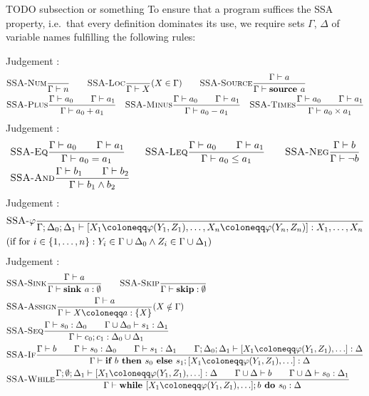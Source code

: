 TODO subsection or something
To ensure that a program suffices the SSA property, i.e.\ that every definition dominates its use,
we require sets $\Gamma$, $\Delta$ of variable names fulfilling the following rules:

Judgement :
\begin{align*}
    &\textsc{SSA-Num}\frac{\displaystyle }{\displaystyle \Gamma \vdash {n}}\qquad
    \textsc{SSA-Loc}\frac{\displaystyle }{\displaystyle \Gamma \vdash {X}}\text{($X \in \Gamma$)}\qquad
    \textsc{SSA-Source}\frac{\displaystyle \Gamma \vdash {a}}{\displaystyle \Gamma \vdash {\textbf{source }{a}}}\\
    &\textsc{SSA-Plus}\frac{\displaystyle \Gamma \vdash {a_0}\qquad\Gamma \vdash {a_1}}{\displaystyle \Gamma \vdash {a_0+a_1}}\quad
    \textsc{SSA-Minus}\frac{\displaystyle \Gamma \vdash {a_0}\qquad\Gamma \vdash {a_1}}{\displaystyle \Gamma \vdash {a_0-a_1}}\quad
    \textsc{SSA-Times}\frac{\displaystyle \Gamma \vdash {a_0}\qquad\Gamma \vdash {a_1}}{\displaystyle \Gamma \vdash {a_0 \times a_1}}
\end{align*}
Judgement :
\begin{align*}
    &\textsc{SSA-Eq}\frac{\displaystyle \Gamma \vdash {a_0}\qquad \Gamma \vdash {a_1}}{\displaystyle \Gamma \vdash {a_0 = a_1}}\qquad
    \textsc{SSA-Leq}\frac{\displaystyle \Gamma \vdash {a_0}\qquad \Gamma \vdash {a_1}}{\displaystyle \Gamma \vdash {a_0 \leq a_1}}\qquad
    \textsc{SSA-Neg}\frac{\displaystyle \Gamma \vdash {b}}{\displaystyle \Gamma \vdash {\neg b}}\\
    &\textsc{SSA-And}\frac{\displaystyle \Gamma \vdash {b_1}\qquad\Gamma \vdash {b_2}}{\displaystyle \Gamma \vdash {b_1 \land b_2}}\\
\end{align*}
Judgement :
\begin{align*}
    &\rule{SSA-$\varphi$}{}{\typestep{\Gamma;\Delta_0;\Delta_1}{\defaultphilistn}{X_1, \ldots, X_n}}\\
    &\text{(if for $i \in \{1, \ldots, n\}: Y_i \in \Gamma \cup \Delta_0 \land Z_i \in \Gamma \cup \Delta_1$)}
\end{align*}
Judgement :
\begin{align*}
    &\rule{SSA-Sink}{\typestmt{\Gamma}{a}}{\typestep{\Gamma}{\sink{a}}{\emptyset}}\qquad
    \rule{SSA-Skip}{}{\typestep{\Gamma}{\skipcmd}{\emptyset}}\\
    &\rule{SSA-Assign}{\typestmt{\Gamma}{a}}{\typestep{\Gamma}{\defaultstore}{\{X\}}} \text{($X \notin \Gamma$)}\\
    &\rule{SSA-Seq}{\typestep{\Gamma}{s_0}{\Delta_0}\qquad
    \typestep{\Gamma \cup \Delta_0}{s_1}{\Delta_1}}{\typestep{\Gamma}{\defaultseq}{\Delta_0 \cup \Delta_1}}\\
    &\rule{SSA-If}{\typestmt{\Gamma}{b}\qquad\typestep{\Gamma}{s_0}{\Delta_0}\qquad \typestep{\Gamma}{s_1}{\Delta_1}\qquad
    \typestep{\Gamma;\Delta_0;\Delta_1}{\defaultphilist}{\Delta}}
    {\typestep{\Gamma}{\defaultssaif}{\Delta}}\\
    &\rule{SSA-While}{\typestep{\Gamma;\emptyset;\Delta_1}{\defaultphilist}{\Delta}\qquad
    \typestmt{\Gamma \cup \Delta}{b}\qquad\typestep{\Gamma \cup \Delta}{s_0}{\Delta_1}}
    {\typestep{\Gamma}{\defaultssawhile}{\Delta}}
\end{align*}


